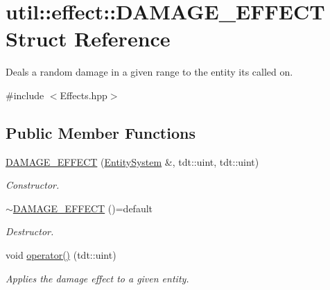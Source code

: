 \hypertarget{structutil_1_1effect_1_1_d_a_m_a_g_e___e_f_f_e_c_t}{}\section{util\+:\+:effect\+:\+:D\+A\+M\+A\+G\+E\+\_\+\+E\+F\+F\+E\+CT Struct Reference}
\label{structutil_1_1effect_1_1_d_a_m_a_g_e___e_f_f_e_c_t}


Deals a random damage in a given range to the entity it\textquotesingle{}s called on.  




{\ttfamily \#include $<$Effects.\+hpp$>$}

\subsection*{Public Member Functions}
\begin{DoxyCompactItemize}
\item 
\hyperlink{structutil_1_1effect_1_1_d_a_m_a_g_e___e_f_f_e_c_t_a364947d50bd41ce12e61677daa1e665d}{D\+A\+M\+A\+G\+E\+\_\+\+E\+F\+F\+E\+CT} (\hyperlink{class_entity_system}{Entity\+System} \&, tdt\+::uint, tdt\+::uint)
\begin{DoxyCompactList}\small\item\em Constructor. \end{DoxyCompactList}\item 
\hyperlink{structutil_1_1effect_1_1_d_a_m_a_g_e___e_f_f_e_c_t_a04a8dacd8ed6af8214f1c2267c68f390}{$\sim$\+D\+A\+M\+A\+G\+E\+\_\+\+E\+F\+F\+E\+CT} ()=default
\begin{DoxyCompactList}\small\item\em Destructor. \end{DoxyCompactList}\item 
void \hyperlink{structutil_1_1effect_1_1_d_a_m_a_g_e___e_f_f_e_c_t_ad561eadd4860a08de7d417798f817e68}{operator()} (tdt\+::uint)
\begin{DoxyCompactList}\small\item\em Applies the damage effect to a given entity. \end{DoxyCompactList}\end{DoxyCompactItemize}
